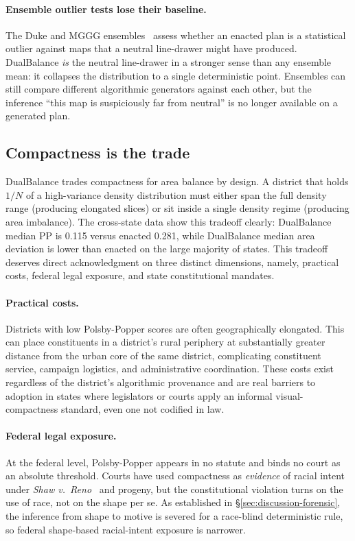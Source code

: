 \paragraph{Ensemble outlier tests lose their baseline.}
The Duke and MGGG ensembles~\cite{mattinglyduke,recom2021} assess
whether an enacted plan is a statistical outlier against maps that a
neutral line-drawer might have produced. DualBalance \emph{is} the
neutral line-drawer in a stronger sense than any ensemble mean: it
collapses the distribution to a single deterministic point. Ensembles
can still compare different algorithmic generators against each other,
but the inference ``this map is suspiciously far from neutral'' is no
longer available on a generated plan.

\subsection{Compactness is the trade}
\label{sec:discussion-compactness}

DualBalance trades compactness for area balance by design. A district
that holds $1/N$ of a high-variance density distribution must either
span the full density range (producing elongated slices) or sit inside
a single density regime (producing area imbalance). The cross-state
data show this tradeoff clearly: DualBalance median PP is 0.115 versus
enacted 0.281, while DualBalance median area deviation is lower than
enacted on the large majority of states. This tradeoff deserves direct
acknowledgment on three distinct dimensions, namely, practical costs,
federal legal exposure, and state constitutional mandates.

\paragraph{Practical costs.}
Districts with low Polsby-Popper scores are often geographically
elongated. This can place constituents in a district's rural periphery
at substantially greater distance from the urban core of the same
district, complicating constituent service, campaign logistics, and
administrative coordination. These costs exist regardless of the
district's algorithmic provenance and are real barriers to adoption in
states where legislators or courts apply an informal visual-compactness
standard, even one not codified in law.

\paragraph{Federal legal exposure.}
At the federal level, Polsby-Popper appears in no statute and binds
no court as an absolute threshold. Courts have used compactness as
\emph{evidence} of racial intent under \textit{Shaw v.~Reno}~\cite{shaw1993}
and progeny, but the constitutional violation turns on the use of race,
not on the shape per se. As established in \S\ref{sec:discussion-forensic},
the inference from shape to motive is severed for a race-blind
deterministic rule, so federal shape-based racial-intent exposure is
narrower.

